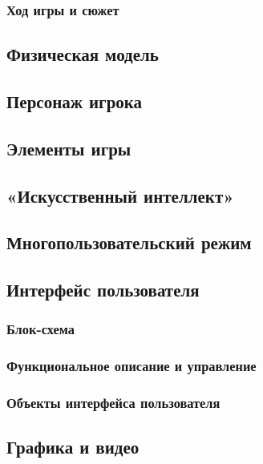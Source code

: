 \documentclass{article}
\begin{document}
\subsubsection{Ход игры и сюжет}

\subsection{Физическая модель}

\subsection{Персонаж игрока}

\subsection{Элементы игры}

\subsection{«Искусственный интеллект»}

\subsection{Многопользовательский режим}

\subsection{Интерфейс пользователя}

\subsubsection{Блок-схема}

\subsubsection{Функциональное описание и управление}

\subsubsection{Объекты интерфейса пользователя}

\subsection{Графика и видео}
\end{document}
